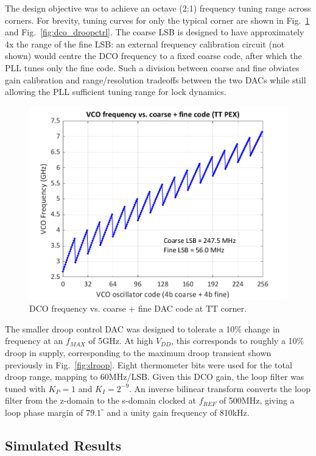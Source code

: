 \documentclass[twoside,9pt,journal,letterpage]{IEEEtran}
\begin{document}
The design objective was to achieve an octave (2:1) frequency tuning range across corners. For brevity, tuning curves for only the typical corner are shown in Fig.\ \ref{fig:dco_oscctrl} and Fig.\ \ref{fig:dco_droopctrl}. The coarse LSB is designed to have approximately 4x the range of the fine LSB: an external frequency calibration circuit (not shown) would centre the DCO frequency to a fixed coarse code, after which the PLL tunes only the fine code. Such a division between coarse and fine obviates gain calibration and range/resolution tradeoffs between the two DACs while still allowing the PLL sufficient tuning range for lock dynamics. 

\begin{figure}[h]
	\centering
	\includegraphics[width=0.7\columnwidth]{fig_dco_oscctrl}
	\caption{DCO frequency vs. coarse + fine DAC code at TT corner.}
	\label{fig:dco_oscctrl}
\end{figure}

The smaller droop control DAC was designed to tolerate a 10\% change in frequency at an $f_{MAX}$ of 5GHz. At high $V_{DD}$, this corresponds to roughly a 10\% droop in supply, corresponding to the maximum droop transient shown previously in Fig.\ \ref{fig:droop}. Eight thermometer bits were used for the total droop range, mapping to 60MHz/LSB. Given this DCO gain, the loop filter was tuned with $K_{P}=1$ and $K_{I}=2^{-9}$. An inverse bilinear transform converts the loop filter from the z-domain to the s-domain clocked at $f_{REF}$ of 500MHz, giving a loop phase margin of $79.1^{\circ}$ and a unity gain frequency of 810kHz.

\vspace{-7pt}
\subsection{Simulated Results}
\end{document}
